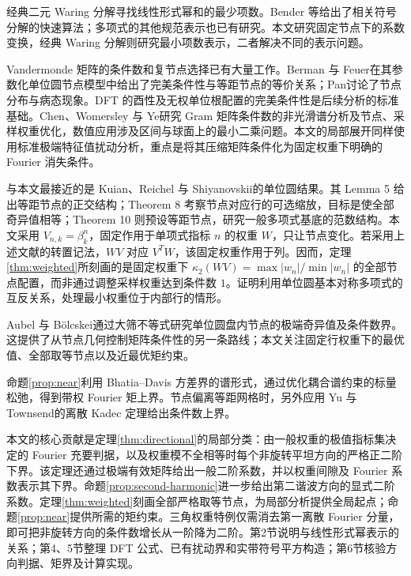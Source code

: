 \documentclass[UTF8,a4paper,zihao=-4,fontset=windows]{ctexart}
\theoremstyle{chinese}
\numberwithin{equation}{section}
\newcommand{\cond}{\kappa_2}
\begin{document}
经典二元 Waring 分解寻找线性形式幂和的最少项数。Bender 等\cite{bender}给出了相关符号分解的快速算法；多项式的其他规范表示也已有研究\cite{reznick}。本文研究固定节点下的系数变换，经典 Waring 分解则研究最小项数表示，二者解决不同的表示问题。

Vandermonde 矩阵的条件数和复节点选择已有大量工作。Berman 与 Feuer\cite[Lemma 3.1]{berman}在其参数化单位圆节点模型中给出了完美条件性与等距节点的等价关系；Pan\cite{pan}讨论了节点分布与病态现象。DFT 的酉性及无权单位根配置的完美条件性是后续分析的标准基础。Chen、Womersley 与 Ye\cite[第2、4节]{chen}研究 Gram 矩阵条件数的非光滑谱分析及节点、采样权重优化，数值应用涉及区间与球面上的最小二乘问题。本文的局部展开同样使用标准极端特征值扰动分析，重点是将其压缩矩阵条件化为固定权重下明确的 Fourier 消失条件。

与本文最接近的是 Kuian、Reichel 与 Shiyanovskii\cite{kuian}的单位圆结果。其 Lemma 5 给出等距节点的正交结构；Theorem 8 考察节点对应行的可选缩放，目标是使全部奇异值相等；Theorem 10 则预设等距节点，研究一般多项式基底的范数结构。本文采用 $V_{n,k}=\beta_k^n$，固定作用于单项式指标 $n$ 的权重 $W$，只让节点变化。若采用上述文献的转置记法，$WV$ 对应 $V^T W$，该固定权重作用于列。因而，定理\ref{thm:weighted}所刻画的是固定权重下 $\cond(WV)=\max|w_n|/\min|w_n|$ 的全部节点配置，而非通过调整采样权重达到条件数 $1$。证明利用单位圆基本对称多项式的互反关系，处理最小权重位于内部行的情形。

Aubel 与 Bölcskei\cite{aubel}通过大筛不等式研究单位圆盘内节点的极端奇异值及条件数界。这提供了从节点几何控制矩阵条件性的另一条路线；本文关注固定行权重下的最优值、全部取等节点以及近最优矩约束。

命题\ref{prop:near}利用 Bhatia--Davis 方差界\cite{bhatia}的谱形式，通过优化耦合谱约束的标量松弛，得到带权 Fourier 矩上界。节点偏离等距网格时，另外应用 Yu 与 Townsend\cite[Theorem 2.1, Corollary 2.3]{yu}的离散 Kadec 定理给出条件数上界。

本文的核心贡献是定理\ref{thm:directional}的局部分类：由一般权重的极值指标集决定的 Fourier 充要判据，以及权重模不全相等时每个非旋转平坦方向的严格正二阶下界。该定理还通过极端有效矩阵给出一般二阶系数，并以权重间隙及 Fourier 系数表示其下界。命题\ref{prop:second-harmonic}进一步给出第二谐波方向的显式二阶系数。定理\ref{thm:weighted}刻画全部严格取等节点，为局部分析提供全局起点；命题\ref{prop:near}提供所需的矩约束。三角权重特例仅需消去第一离散 Fourier 分量，即可把非旋转方向的条件数增长从一阶降为二阶。第2节说明与线性形式幂表示的关系；第4、5节整理 DFT 公式、已有扰动界和实带符号平方构造；第6节核验方向判据、矩界及计算实现。
\end{document}
